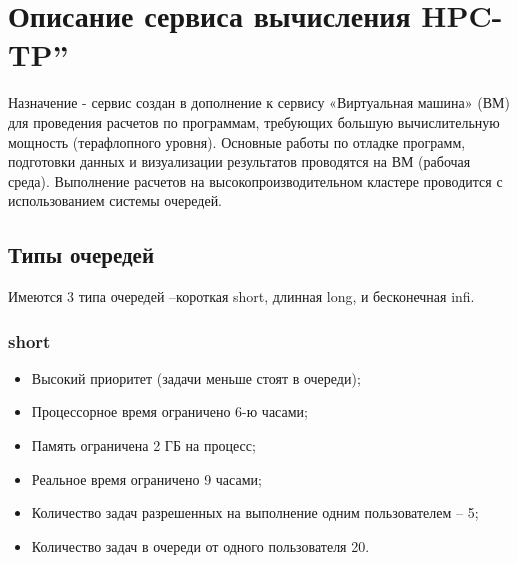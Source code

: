 \documentclass[a4paper,8pt]{extreport}
\newcounter{ex}
\begin{document}
\tableofcontents

\lstset{language=, linewidth=1.0\textwidth, breaklines=true,
breakatwhitespace=true, frame=single, framexleftmargin=0em,
resetmargins=true,
columns=flexible,
flexiblecolumns,
inputencoding=utf8,
extendedchars=\true,
escapechar=\%,
texcl,
}
\frenchspacing

\pagestyle{fancy}

\chapter{Описание сервиса  вычисления HPC-TP\textquotedblright}

Назначение - сервис создан в дополнение к сервису «Виртуальная машина» (ВМ) для проведения расчетов по программам,
требующих большую вычислительную мощность (терафлопного уровня). Основные работы по отладке программ, 
подготовки данных и визуализации результатов проводятся на ВМ (рабочая среда). Выполнение расчетов на 
высокопроизводительном кластере проводится с использованием системы очередей. 

\section{Типы очередей}
Имеются 3 типа очередей –короткая short, длинная long, и бесконечная infi. 

\subsection{short}
\begin{itemize}
  \item Высокий приоритет (задачи меньше стоят в очереди);
  \item Процессорное время ограничено 6-ю часами;
  \item Память ограничена 2 ГБ на процесс;
  \item Реальное время ограничено 9 часами;
  \item Количество задач разрешенных на выполнение одним пользователем -- 5;
  \item Количество задач в очереди от одного пользователя 20.
\end{itemize}
\end{document}
